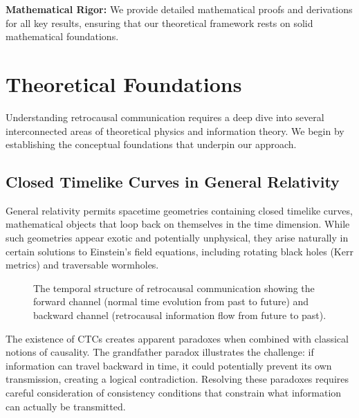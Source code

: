 \documentclass[12pt,a4paper]{article}
\begin{document}
\textbf{Mathematical Rigor:} We provide detailed mathematical proofs and derivations for all key results, ensuring that our theoretical framework rests on solid mathematical foundations.

\section{Theoretical Foundations}

Understanding retrocausal communication requires a deep dive into several interconnected areas of theoretical physics and information theory. We begin by establishing the conceptual foundations that underpin our approach.

\subsection{Closed Timelike Curves in General Relativity}

General relativity permits spacetime geometries containing closed timelike curves, mathematical objects that loop back on themselves in the time dimension. While such geometries appear exotic and potentially unphysical, they arise naturally in certain solutions to Einstein's field equations, including rotating black holes (Kerr metrics) and traversable wormholes.

\begin{figure}[H]
\centering
{}
\caption{The temporal structure of retrocausal communication showing the forward channel (normal time evolution from past to future) and backward channel (retrocausal information flow from future to past).}
\end{figure}

The existence of CTCs creates apparent paradoxes when combined with classical notions of causality. The grandfather paradox illustrates the challenge: if information can travel backward in time, it could potentially prevent its own transmission, creating a logical contradiction. Resolving these paradoxes requires careful consideration of consistency conditions that constrain what information can actually be transmitted.
\end{document}
